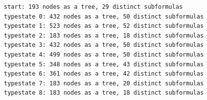 \begin{lstlisting}[language={},basicstyle=\ttfamily\footnotesize,breaklines=true]
start: 193 nodes as a tree, 29 distinct subformulas
typestate 0: 432 nodes as a tree, 50 distinct subformulas
typestate 1: 523 nodes as a tree, 52 distinct subformulas
typestate 2: 183 nodes as a tree, 18 distinct subformulas
typestate 3: 432 nodes as a tree, 50 distinct subformulas
typestate 4: 499 nodes as a tree, 50 distinct subformulas
typestate 5: 348 nodes as a tree, 43 distinct subformulas
typestate 6: 361 nodes as a tree, 42 distinct subformulas
typestate 7: 183 nodes as a tree, 20 distinct subformulas
typestate 8: 183 nodes as a tree, 18 distinct subformulas
\end{lstlisting}
